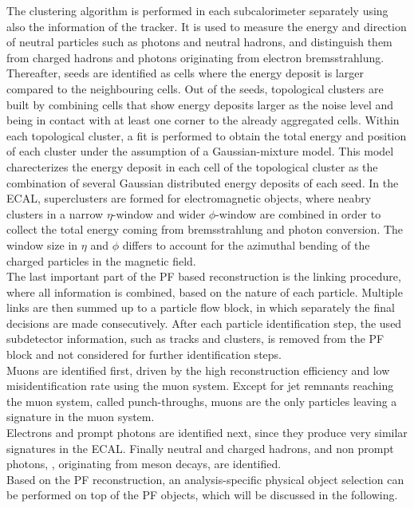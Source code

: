 The clustering algorithm is performed in each subcalorimeter separately using also the information of the tracker. It is used to measure the energy and direction of neutral particles such as photons and neutral hadrons, and distinguish them from charged hadrons and photons originating from electron bremsstrahlung. Thereafter, seeds are identified as cells where the energy deposit is larger compared to the neighbouring cells. Out of the seeds, topological clusters are built by combining cells that show energy deposits larger as the noise level and being in contact with at least one corner to the already aggregated cells. Within each topological cluster, a fit is performed to obtain the total energy and position of each cluster under the assumption of a Gaussian-mixture model. This model charecterizes the energy deposit in each cell of the topological cluster as the combination of several Gaussian distributed energy deposits of each seed. In the ECAL, superclusters are formed for electromagnetic objects, where neabry clusters in a narrow $\eta$-window and wider $\phi$-window are combined in order to collect the total energy coming from bremsstrahlung and photon conversion. The window size in $\eta$ and $\phi$ differs to account for the azimuthal bending of the charged particles in the magnetic field.\\
The last important part of the PF based reconstruction is the linking procedure, where all information is combined, based on the nature of each particle. Multiple links are then summed up to a particle flow block, in which separately the final decisions are made consecutively. After each particle identification step, the used subdetector information, such as tracks and clusters, is removed from the PF block and not considered for further identification steps.\\
Muons are identified first, driven by the high reconstruction efficiency and low misidentification rate using the muon system. Except for jet remnants reaching the muon system, called punch-throughs, muons are the only particles leaving a signature in the muon system.\\
Electrons and prompt photons are identified next, since they produce very similar signatures in the ECAL. Finally neutral and charged hadrons, and non prompt photons, \eg, originating from meson decays, are identified.\\
Based on the PF reconstruction, an analysis-specific physical object selection can be performed on top of the PF objects, which will be discussed in the following.
















